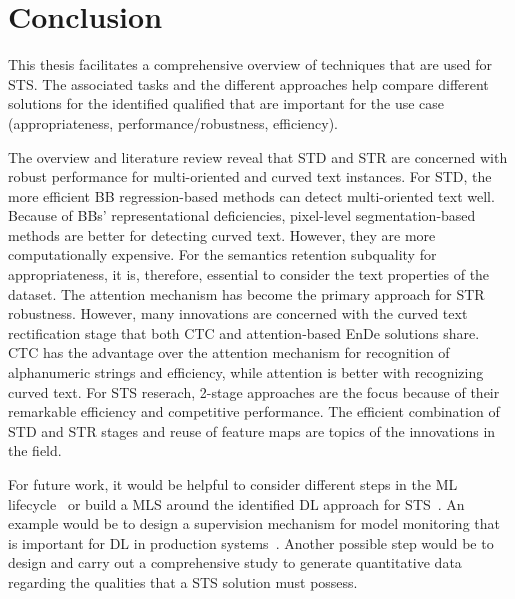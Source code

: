 \chapter{Conclusion}
This thesis facilitates a comprehensive overview of techniques that are used for \ac{STS}.
The associated tasks and the different approaches help compare different
solutions for the identified qualified that are important for the use case
(appropriateness, performance/robustness, efficiency).

The overview and literature review reveal that \ac{STD} and \ac{STR} are concerned
with robust performance for multi-oriented and curved text instances.
For \ac{STD}, the more efficient \ac{BB} regression-based methods can detect multi-oriented text well.
Because of \acp{BB}' representational deficiencies, pixel-level segmentation-based methods are better for
detecting curved text.
However, they are more computationally expensive.
For the semantics retention subquality for appropriateness, it is, therefore, essential to consider
the text properties of the dataset.
The attention mechanism has become the primary approach for \ac{STR} robustness.
However, many innovations are concerned with the curved text rectification stage that both
\ac{CTC} and attention-based \ac{EnDe} solutions share.
\ac{CTC} has the advantage over the attention mechanism for recognition of alphanumeric strings
and efficiency, while attention is better with recognizing curved text.
For \ac{STS} reserach, 2-stage approaches are the focus because of their remarkable efficiency and
competitive performance.
The efficient combination of \ac{STD} and \ac{STR} stages and reuse of feature maps are topics
of the innovations in the field.

For future work, it would be helpful to consider different steps in the \ac{ML}
lifecycle~\citep{watanabe_preliminary_2019} or build a \ac{MLS} around the identified \ac{DL}
approach for \ac{STS}~\citep{siebert_construction_2021,nakamichi_requirements-driven_2020}.
An example would be to design a supervision mechanism for model monitoring that is important for
\ac{DL} in production systems~\cite{nakamichi_requirements-driven_2020,watanabe_preliminary_2019}.
Another possible step would be to design and carry out a comprehensive study to generate quantitative
data regarding the qualities that a \ac{STS} solution must possess.

